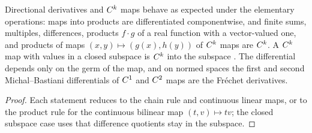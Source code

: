 \begin{proposition}[Operations]
  \label{prop:operations}
  \leanok
  Directional derivatives and $C^{k}$ maps behave as expected under the elementary operations:
  maps into products are differentiated componentwise, and finite sums, multiples, differences,
  products $f \cdot g$ of a real function with a vector-valued one, and products of maps
  $(x, y) \mapsto (g(x), h(y))$ of $C^{k}$ maps are $C^{k}$. A $C^{k}$ map with values in a
  closed subspace is $C^{k}$ into the subspace \cite[compare Lemma~1.3.19]{GN26}. The
  differential depends only on the germ of the map, and on normed spaces the first and second
  Michal--Bastiani differentials of $C^{1}$ and $C^{2}$ maps are the Fréchet derivatives.
\end{proposition}

\begin{proof}
  \leanok
  Each statement reduces to the chain rule and continuous linear maps, or to the product rule
  for the continuous bilinear map $(t, v) \mapsto tv$; the closed subspace case uses that
  difference quotients stay in the subspace.
\end{proof}
